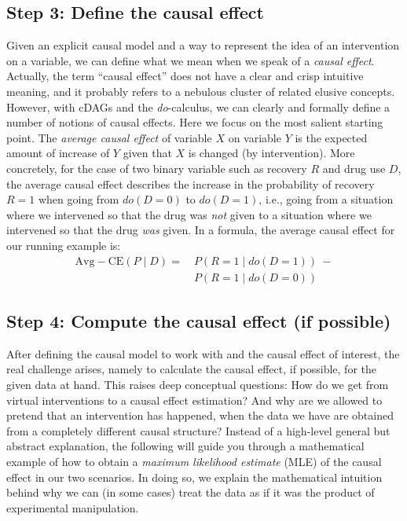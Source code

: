 \documentclass[nobib]{tufte-handout}
\newcommand{\docalc}{\emph{do}-calculus\xspace}
\newcommand{\mathdo}{\mathit{do}}
\begin{document}
\subsection{Step 3: Define the causal effect} \label{sec:step3}

Given an explicit causal model and a way to represent the idea of an intervention on a variable, we can define what we mean when we speak of a \textit{causal effect}.
Actually, the term ``causal effect'' does not have a clear and crisp intuitive meaning, and it probably refers to a nebulous cluster of related elusive concepts.
However, with cDAGs and the \docalc, we can clearly and formally define a number of notions of causal effects.
Here we focus on the most salient starting point.
The \textit{average causal effect} of variable $X$ on variable $Y$ is the expected amount of increase of $Y$ given that $X$ is changed (by intervention).
More concretely, for the case of two binary variable such as recovery $R$ and drug use $D$, the average causal effect describes the increase in the probability of recovery $R = 1$ when going from $\mathdo(D=0)$ to $\mathdo(D=1)$, i.e., going from a situation where we intervened so that the drug was \textit{not} given to a situation where we intervened so that the drug \textit{was} given.
In a formula, the average causal effect for our running example is:
\begin{align*}
  \mathrm{Avg-CE}(P \mid D) = & \ P(R=1 \mid \mathdo(D=1)) \  -
                        \\ & \ P(R=1 \mid \mathdo(D=0))
\end{align*}


\subsection{Step 4: Compute the causal effect (if possible)} \label{sec:step4}

After defining the causal model to work with and the causal effect of interest, the real challenge arises, namely to calculate the causal effect, if possible, for the given data at hand.
This raises deep conceptual questions:
How do we get from virtual interventions to a causal effect estimation?
And why are we allowed to pretend that an intervention has happened, when the data we have are obtained from a completely different causal structure?
Instead of a high-level general but abstract explanation, the following will guide you through a mathematical example of how to obtain a \textit{maximum likelihood estimate} (MLE) of the causal effect in our two scenarios.
In doing so, we explain the mathematical intuition behind why we can (in some cases) treat the data as if it was the product of experimental manipulation.
\end{document}
